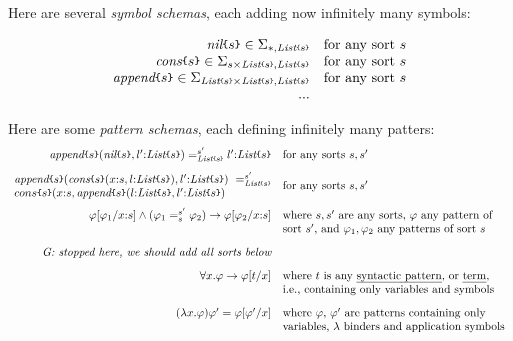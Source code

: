 \documentclass[UTF8,11pt]{article}
\theoremstyle{plain}
\theoremstyle{definition}
\theoremstyle{remark}
\newcommand{\cln}{{:}}
\newcommand{\List}{\textit{List}}
\newcommand{\nil}{\textit{nil}}
\newcommand{\cons}{\textit{cons}}
\newcommand{\append}{\textit{append}}
\newcommand{\parametric}[2]{{#1}\raisebox{.2ex}{\texttt{\footnotesize{\{}}}#2\raisebox{.2ex}{\texttt{\footnotesize{\}}}}}
\newcommand{\parametricscript}[2]{{#1}\raisebox{.2ex}{\texttt{\tiny{\{}}}#2\raisebox{.2ex}{\texttt{\tiny{\}}}}}
\begin{document}
Here are several \emph{symbol schemas}, each adding now infinitely many symbols:

$$
\begin{array}{rl}
\parametric{\nil}{s} \in \Sigma_{*,\parametricscript{\List}{s}} &
\textrm{for any sort $s$} \\
\parametric{\cons}{s} \in \Sigma_{s\times\parametricscript{\List}{s},\parametricscript{\List}{s}} &
\textrm{for any sort $s$} \\
\parametric{\append}{s} \in \Sigma_{\parametricscript{\List}{s}\times\parametricscript{\List}{s},\parametricscript{\List}{s}} &
\textrm{for any sort $s$} \\
...
\end{array}
$$

Here are some \emph{pattern schemas}, each defining infinitely many patters:
$$
\begin{array}{rl}
\parametric{\append}{s}(\parametric{\nil}{s},l'\cln\parametric{\List}{s})
=_{\parametricscript{\List}{s}}^{s'} l'\cln\parametric{\List}{s}
& \textrm{for any sorts $s, s'$}
\\[2ex]
\begin{array}{@{}l@{}}
\parametric{\append}{s}(\parametric{\cons}{s}(x\cln s,l\cln\parametric{\List}{s}),l'\cln\parametric{\List}{s})
\ =_{\parametricscript{\List}{s}}^{s'} 
\\
\parametric{cons}{s}(x\cln s,\parametric{\append}{s}(l\cln\parametric{\List}{s},l'\cln\parametric{\List}{s})
\end{array}
& \textrm{for any sorts $s, s'$}
\\[3ex]
\varphi[\varphi_1/{x\cln s}] \wedge (\varphi_1 =_s^{s'} \varphi_2) \rightarrow \varphi[\varphi_2/{x\cln s}]
&\textrm{where $s,s'$ are any sorts, $\varphi$ any pattern of} \\
& \textrm{sort $s'$, and $\varphi_1,\varphi_2$ any patterns of sort $s$}
\\[2ex]
\textit{G: stopped here, we should add all sorts below}
\\[2ex]
\forall x . \varphi \rightarrow \varphi[t/x]
&\textrm{where $t$ is any \emph{syntactic pattern}, or \emph{term}}, \\
& \textrm{i.e., containing only variables and symbols}
\\[2ex]
(\lambda x . \varphi)\varphi' = \varphi[\varphi'/x]
& \textrm{where $\varphi$, $\varphi'$ are patterns containing only}
\\
& \textrm{variables, $\lambda$ binders and application symbols}
\\[2ex]

\end{array}$$
\end{document}
